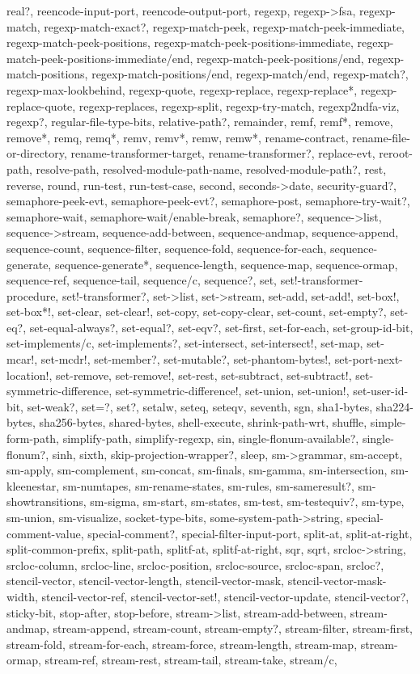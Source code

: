{{real?, reencode-input-port, reencode-output-port, regexp, regexp->fsa, regexp-match, regexp-match-exact?, regexp-match-peek, regexp-match-peek-immediate, regexp-match-peek-positions, regexp-match-peek-positions-immediate, regexp-match-peek-positions-immediate/end, regexp-match-peek-positions/end, regexp-match-positions, regexp-match-positions/end, regexp-match/end, regexp-match?, regexp-max-lookbehind, regexp-quote, regexp-replace, regexp-replace*, regexp-replace-quote, regexp-replaces, regexp-split, regexp-try-match, regexp2ndfa-viz, regexp?, regular-file-type-bits, relative-path?, remainder, remf, remf*, remove, remove*, remq, remq*, remv, remv*, remw, remw*, rename-contract, rename-file-or-directory, rename-transformer-target, rename-transformer?, replace-evt, reroot-path, resolve-path, resolved-module-path-name, resolved-module-path?, rest, reverse, round, run-test, run-test-case, second, seconds->date, security-guard?, semaphore-peek-evt, semaphore-peek-evt?, semaphore-post, semaphore-try-wait?, semaphore-wait, semaphore-wait/enable-break, semaphore?, sequence->list, sequence->stream, sequence-add-between, sequence-andmap, sequence-append, sequence-count, sequence-filter, sequence-fold, sequence-for-each, sequence-generate, sequence-generate*, sequence-length, sequence-map, sequence-ormap, sequence-ref, sequence-tail, sequence/c, sequence?, set, set!-transformer-procedure, set!-transformer?, set->list, set->stream, set-add, set-add!, set-box!, set-box*!, set-clear, set-clear!, set-copy, set-copy-clear, set-count, set-empty?, set-eq?, set-equal-always?, set-equal?, set-eqv?, set-first, set-for-each, set-group-id-bit, set-implements/c, set-implements?, set-intersect, set-intersect!, set-map, set-mcar!, set-mcdr!, set-member?, set-mutable?, set-phantom-bytes!, set-port-next-location!, set-remove, set-remove!, set-rest, set-subtract, set-subtract!, set-symmetric-difference, set-symmetric-difference!, set-union, set-union!, set-user-id-bit, set-weak?, set=?, set?, setalw, seteq, seteqv, seventh, sgn, sha1-bytes, sha224-bytes, sha256-bytes, shared-bytes, shell-execute, shrink-path-wrt, shuffle, simple-form-path, simplify-path, simplify-regexp, sin, single-flonum-available?, single-flonum?, sinh, sixth, skip-projection-wrapper?, sleep, sm->grammar, sm-accept, sm-apply, sm-complement, sm-concat, sm-finals, sm-gamma, sm-intersection, sm-kleenestar, sm-numtapes, sm-rename-states, sm-rules, sm-sameresult?, sm-showtransitions, sm-sigma, sm-start, sm-states, sm-test, sm-testequiv?, sm-type, sm-union, sm-visualize, socket-type-bits, some-system-path->string, special-comment-value, special-comment?, special-filter-input-port, split-at, split-at-right, split-common-prefix, split-path, splitf-at, splitf-at-right, sqr, sqrt, srcloc->string, srcloc-column, srcloc-line, srcloc-position, srcloc-source, srcloc-span, srcloc?, stencil-vector, stencil-vector-length, stencil-vector-mask, stencil-vector-mask-width, stencil-vector-ref, stencil-vector-set!, stencil-vector-update, stencil-vector?, sticky-bit, stop-after, stop-before, stream->list, stream-add-between, stream-andmap, stream-append, stream-count, stream-empty?, stream-filter, stream-first, stream-fold, stream-for-each, stream-force, stream-length, stream-map, stream-ormap, stream-ref, stream-rest, stream-tail, stream-take, stream/c, }}
